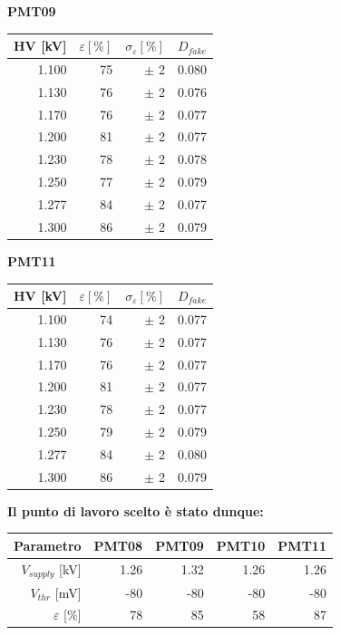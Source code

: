 \documentclass[10pt,a4paper]{article}
\begin{document}
\begin{center}
\vspace{1cm}

\begin{minipage}{0.48\textwidth}
\centering
\textbf{PMT09}

\vspace{0.25cm}

\begin{tabular}{|r|r|r|r|}
\toprule
HV [kV] & $\varepsilon [\%]$ & $\sigma_{\varepsilon} [\%]$ & $D_{fake}$ \\
\midrule
1.100 & 75 & $\pm$ 2 & 0.080 \\
1.130 & 76 & $\pm$ 2 & 0.076 \\
1.170 & 76 & $\pm$ 2 & 0.077 \\
1.200 & 81 & $\pm$ 2 & 0.077 \\
1.230 & 78 & $\pm$ 2 & 0.078 \\
1.250 & 77 & $\pm$ 2 & 0.079 \\
1.277 & 84 & $\pm$ 2 & 0.077 \\
1.300 & 86 & $\pm$ 2 & 0.079 \\
\bottomrule
\end{tabular}
\end{minipage}
\hfill
\begin{minipage}{0.48\textwidth}
\centering
\textbf{PMT11}

\vspace{0.25cm}

\begin{tabular}{|r|r|r|r|}
\toprule
HV [kV] & $\varepsilon [\%]$ & $\sigma_{\varepsilon} [\%]$ & $D_{fake}$ \\
\midrule
1.100 & 74 & $\pm$ 2 & 0.077 \\
1.130 & 76 & $\pm$ 2 & 0.077 \\
1.170 & 76 & $\pm$ 2 & 0.077 \\
1.200 & 81 & $\pm$ 2 & 0.077 \\
1.230 & 78 & $\pm$ 2 & 0.077 \\
1.250 & 79 & $\pm$ 2 & 0.079 \\
1.277 & 84 & $\pm$ 2 & 0.080 \\
1.300 & 86 & $\pm$ 2 & 0.079 \\
\bottomrule
\end{tabular}
\end{minipage}

\vspace{1.2cm}

\textbf{Il punto di lavoro scelto è stato dunque:}

\vspace{0.6cm}

\begin{tabular}{|r|r|r|r|r|}
\toprule
Parametro & PMT08 & PMT09 & PMT10 & PMT11 \\
\midrule
$V_{supply}$ [kV] & 1.26  & 1.32  & 1.26  & 1.26  \\
$V_{thr}$ [mV] & -80 & -80 & -80 & -80 \\
$\varepsilon$ [$\%$] & 78  & 85  & 58 & 87 \\
\bottomrule
\end{tabular}

\end{center}
\end{document}
